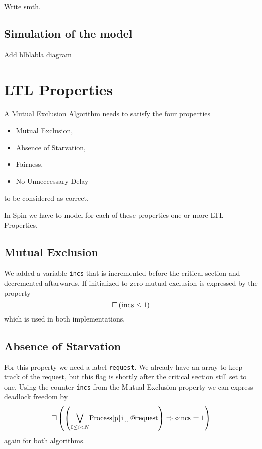 \documentclass{llncs}
\begin{document}
Write smth.

\subsection{Simulation of the model\label{ssec:run}}

Add blblabla diagram

\section{LTL Properties}

A Mutual Exclusion Algorithm needs to satisfy the four properties
\begin{itemize}
    \item Mutual Exclusion,
    \item Absence of Starvation,
    \item Fairness,
    \item No Unneccessary Delay
\end{itemize}
to be considered as correct.

In Spin we have to model for each of these properties one or more
LTL - Properties.

\subsection{Mutual Exclusion}

We added a variable \lstinline|incs| that is incremented before the critical section
and decremented aftarwards. If initialized to zero mutual exclusion is expressed by the
property
\begin{equation}
    \square \left( \text{\lstinline|incs|} \leq 1 \right)
\end{equation}
which is used in both implementations.

\subsection{Absence of Starvation}

For this property we need a label \lstinline|request|. We already have an array to keep track of the request,
but this flag is shortly after the critical section still set to one.
Using the counter \lstinline|incs| from the Mutual Exclusion property we can express deadlock freedom by
\begin{equation}
    \square \left( \left( \underset{0\leq i < N}{\bigvee} \text{\lstinline|Process[p[i]]@request|}\right) \Rightarrow \diamond \text{\lstinline|incs|} = 1 \right)
\end{equation}
again for both algorithms.
\end{document}
